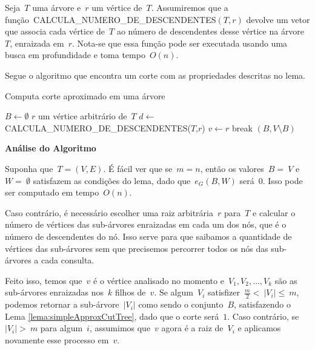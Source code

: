 \documentclass[a4paper,12pt]{article}
\begin{document}
\bigskip

Seja~$T$ uma árvore e~$r$ um vértice de~$T$. 
Assumiremos que
a função~CALCULA\_NUMERO\_DE\_DESCENDENTES$(T,r)$ devolve um vetor
que associa cada vértice de~$T$ ao número de descendentes desse 
vértice na árvore~$T$, enraizada em~$r$. Nota-se que essa função pode
ser executada usando uma busca em profundidade e toma tempo~$O(n)$.


Segue o algoritmo que encontra um corte com as propriedades descritas
no lema.

\medskip

\begin{algorithm}[H]
\label{alg:simpleApproxCutTree}

	\caption{Computa corte aproximado em uma árvore}
	$B \gets \emptyset$\;
	{
		$r$ um vértice arbitrário de~$T$\;
		$d \gets~$ CALCULA\_NUMERO\_DE\_DESCENDENTES($T$,$r$)\;
		$v \gets r$\;
		{
		{
			{
				break\;
			}
		}
		}
	}
	\Return $(B,V\setminus B)$

\end{algorithm}	

\bigskip
\bigskip
\bigskip

\textbf{Análise do Algoritmo}

	Suponha que~$T=(V,E)$.
	É fácil ver que se~$m=n$, então os valores~$B =~V$ e~$W =~\emptyset$ 
	satisfazem as condições do lema, dado que~$e_G(B,W)$ será~$0$. 
	Isso pode ser computado em tempo~$O(n)$.

	Caso contrário, é necessário escolher uma raiz arbitrária~$r$ para~$T$
	e calcular o número de vértices das sub-árvores enraizadas 
	em cada um dos nós, que é o número de descendentes do nó.
	Isso serve para que saibamos a quantidade de vértices das sub-árvores
	sem que precisemos percorrer todos os nós das sub-árvores a cada consulta.

	Feito isso, temos que~$v$ é o vértice analisado no momento 
	e~$V_1, V_2, \ldots, V_k$ são as sub-árvores enraizadas nos~$k$ filhos
	de~$v$.
	Se algum~$V_i$ satisfizer~$\frac{m}{2}<~|V_i|\le~m$, podemos retornar
	a sub-árvore~$|V_i|$ como sendo o conjunto~$B$, satisfazendo o Lema 
	\ref{lema:simpleApproxCutTree},
	dado que o corte será~$1$.
	Caso contrário, se~$|V_i|>~m$ para algum~$i$, assumimos que~$v$ 
	agora é a raiz de~$V_i$ e aplicamos novamente esse processo em~$v$.
\end{document}
